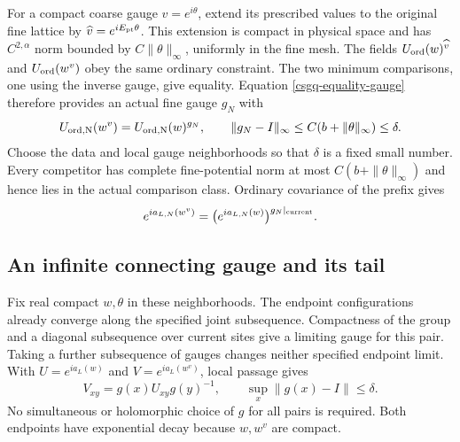 \documentclass[11pt]{article}
\theoremstyle{remark}
\begin{document}
For a compact coarse gauge $v=e^{i\theta}$, extend its prescribed values
to the original fine lattice by
$\widehat v=e^{iE_{\rm pt}\theta}$. This extension is compact in physical
space and has $C^{2,\alpha}$ norm bounded by $C\|\theta\|_\infty$,
uniformly in the fine mesh. The fields
$U_{\rm ord}(w)^{\widehat v}$ and $U_{\rm ord}(w^v)$ obey the same
ordinary constraint. The two minimum comparisons, one using the
inverse gauge, give equality. Equation \eqref{csgq-equality-gauge}
therefore provides an actual fine gauge $g_N$ with
\begin{equation}
 U_{\rm ord,N}(w^v)=U_{\rm ord,N}(w)^{g_N},\qquad
 \|g_N-I\|_\infty\le C(b+\|\theta\|_\infty)\le\delta.
 \label{csgq-finite-orbit}
\end{equation}
Choose the data and local gauge neighborhoods so that $\delta$ is a
fixed small number. Every competitor has complete fine-potential norm
at most $C(b+\|\theta\|_\infty)$ and hence lies in the actual comparison
class. Ordinary covariance of the prefix gives
\begin{equation}
 e^{ia_{L,N}(w^v)}
       =\bigl(e^{ia_{L,N}(w)}\bigr)^{g_N|_{\rm current}}.
 \label{csgq-prefix-orbit}
\end{equation}

\subsection{An infinite connecting gauge and its tail}
\label{csgq-tail-section}

Fix real compact $w,\theta$ in these neighborhoods. The endpoint
configurations already converge along the specified joint subsequence.
Compactness of the group and a diagonal subsequence over current sites
give a limiting gauge for this pair. Taking a further subsequence of
gauges changes neither specified endpoint limit. With
$U=e^{ia_L(w)}$ and $V=e^{ia_L(w^v)}$, local passage gives
\begin{equation}
 V_{xy}=g(x)U_{xy}g(y)^{-1},\qquad
                 \sup_x\|g(x)-I\|\le\delta.
 \label{csgq-infinite-orbit}
\end{equation}
No simultaneous or holomorphic choice of $g$ for all pairs is required.
Both endpoints have exponential decay because $w,w^v$ are compact.
\end{document}
